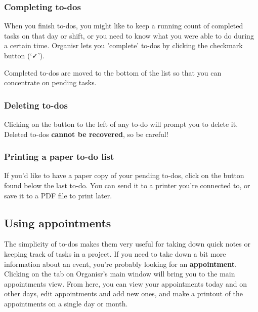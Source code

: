 \subsubsection{Completing to-dos}


When you finish to-dos, you might like to keep a running count of completed
tasks on that day or shift, or you need to know what you were able to do during
a certain time. Organisr lets you 'complete' to-dos by clicking the
checkmark button (`✓').

Completed to-dos are moved to the bottom of the list so that you can concentrate
on pending tasks.


\subsubsection{Deleting to-dos}


Clicking on the  button to the left of any to-do will prompt you to
delete it. Deleted to-dos \textbf{cannot be recovered}, so be careful!



\subsubsection{Printing a paper to-do list}


If you'd like to have a paper copy of your pending to-dos, click on the
 button found below the last to-do. You can send it to a printer
you're connected to, or save it to a PDF file to print later.



\subsection{Using appointments}


The simplicity of to-dos makes them very useful for taking down quick notes or
keeping track of tasks in a project. If you need to take down a bit more
information about an event, you're probably looking for an \textbf{appointment}.
Clicking on the  tab on Organisr's main window will bring
you to the main appointments view. From here, you can view your appointments
today and on other days, edit appointments and add new ones, and make a printout
of the appointments on a single day or month.


